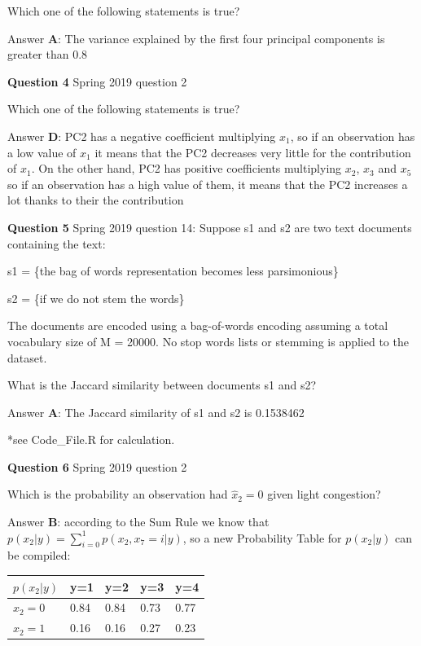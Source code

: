 \documentclass[
]{article}
\begin{document}
Which one of the following statements is true?

Answer \textbf{A}: The variance explained by the first four principal
components is greater than 0.8

\textbf{Question 4} \textbar{} Spring 2019 question 2

Which one of the following statements is true?

Answer \textbf{D}: PC2 has a negative coefficient multiplying \(x_1\),
so if an observation has a low value of \(x_1\) it means that the PC2
decreases very little for the contribution of \(x_1\). On the other
hand, PC2 has positive coefficients multiplying \(x_2\), \(x_3\) and
\(x_5\) so if an observation has a high value of them, it means that the
PC2 increases a lot thanks to their the contribution

\textbf{Question 5} \textbar{} Spring 2019 question 14: Suppose s1 and
s2 are two text documents containing the text:

s1 = \{the bag of words representation becomes less parsimonious\}

s2 = \{if we do not stem the words\}

The documents are encoded using a bag-of-words encoding assuming a total
vocabulary size of M = 20000. No stop words lists or stemming is applied
to the dataset.

What is the Jaccard similarity between documents s1 and s2?

Answer \textbf{A}: The Jaccard similarity of s1 and s2 is 0.1538462

*see Code\_File.R for calculation.

\textbf{Question 6} \textbar{} Spring 2019 question 2

Which is the probability an observation had \(\hat{x}_2=0\) given light
congestion?

Answer \textbf{B}: according to the Sum Rule we know that
\(p(x_2|y)= \sum_{i=0}^{1} p(x_2,x_7=i|y)\), so a new Probability Table
for \(p(x_2|y)\) can be compiled:

\begin{longtable}[]{@{}lllll@{}}
\toprule\noalign{}
\(p(x_2 |y)\) & y=1 & y=2 & y=3 & y=4 \\
\midrule\noalign{}
\endhead
\bottomrule\noalign{}
\endlastfoot
\(x_2=0\) & 0.84 & 0.84 & 0.73 & 0.77 \\
\(x_2=1\) & 0.16 & 0.16 & 0.27 & 0.23 \\
\end{longtable}
\end{document}
